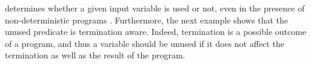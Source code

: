  determines whether a given input variable is used or not, even in the presence of non-deterministic programs%
.
Furthermore, the next example shows that the unused predicate is termination aware.
Indeed, termination is a possible outcome of a program, and thus a variable should be unused if it does not affect the termination as well as the result of the program.

